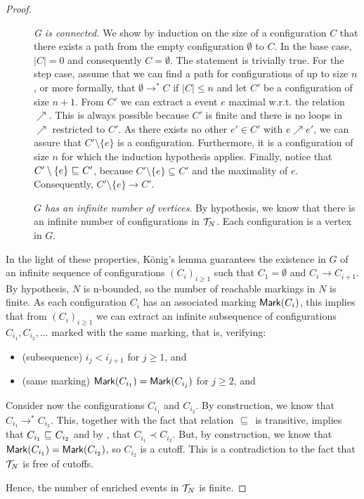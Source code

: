 \begin{proof}
\begin{description}
\item[] \emph{G is connected.}  We show by induction on the size of a
configuration $C$ that there exists a path from the empty configuration
$\emptyset$ to $C$.  In the base case, $|C| = 0$ and consequently $C =
\emptyset$.  The statement is trivially true.  For the step case, assume that
we can find a path for configurations of up to size $n$, or more formally, that
$\emptyset \to^* C$ if $|C| \le n$ and let $C'$ be a configuration of size
$n+1$.  From $C'$ we can extract a event $e$ maximal w.r.t. the relation
$\nearrow$.  This is always possible because $C'$ is finite and there is no
loops in $\nearrow$ restricted to $C'$.  As there exists no other $e' \in C'$
with $e \nearrow e'$, we can assure that $C' \setminus \{e\}$ is a
configuration.  Furthermore, it is a configuration of size $n$ for which the
induction hypothesis applies.  Finally, notice that $C' \setminus \{e\}
{\ \sqsubseteq \ } C'$, because $C' \setminus \{e\} \subseteq C'$ and the maximality
of $e$.  Consequently, $C' \setminus \{e\} \to C'$.

\item[] \emph{$G$ has an infinite number of vertices}.  By hypothesis, we know
that there is an infinite number of configurations in $\mathcal{T}_{N}$.  Each
configuration is a vertex in $G$.
\end{description}

In the light of these properties, K\"{o}nig's lemma guarantees the existence in
$G$ of an infinite sequence of configurations $(C_i)_{i \ge 1}$ such that $C_1
= \emptyset$ and $C_i \to C_{i+1}$.  By hypothesis, $N$ is n-bounded, so the
number of reachable markings in $N$ is finite.  As each configuration $C_i$ has
an associated marking $\mathsf{Mark }{(C_i)}$, this implies that from $(C_i)_{i \ge 1}$
we can extract an infinite subsequence of configurations $C_{i_1}, C_{i_2},
\ldots$ marked with the same marking, that is, verifying:

\begin{itemize}
\item (subsequence) $i_j < i_{j+1}$ for $j \ge 1$, and
\item (same marking) $\mathsf{Mark }{(C_{i_1})} = \mathsf{Mark }{(C_{i_j})}$ for $j \ge 2$, and
\end{itemize}

Consider now the configurations $C_{i_1}$ and $C_{i_2}$.  By construction, we
know that $C_{i_1} \to^* C_{i_2}$.  This, together with the fact that relation
${\ \sqsubseteq \ }$ is transitive, implies that $C_{i_1} {\ \sqsubseteq \ } C_{i_2}$ and by
, that $C_{i_1} \prec C_{i_2}$.  But, by construction, we
know that $\mathsf{Mark }{(C_{i_1})} = \mathsf{Mark }{(C_{i_2})}$, so $C_{i_2}$ is a cutoff.
This is a contradiction to the fact that $\mathcal{T}_{N}$ is free of cutoffs.

Hence, the number of enriched events in $\mathcal{T}_{N}$ is finite.
\end{proof}

